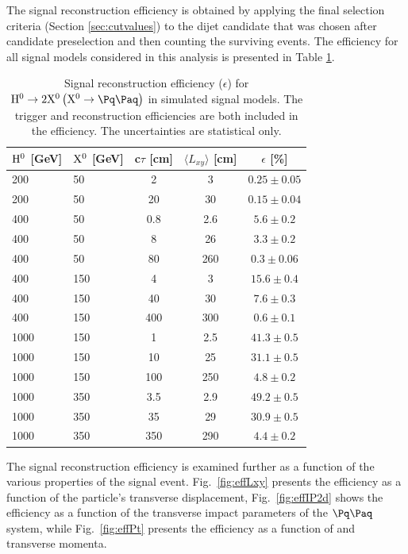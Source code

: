 The signal reconstruction efficiency is obtained by applying the final selection
criteria (Section \ref{sec:cutvalues}) to the dijet candidate that was chosen 
after candidate preselection and then counting the surviving events.
The efficiency for all signal models considered in this analysis
is presented in Table 
\ref{tab:sigeff}. 

\begin{table}[htbp]
\centering
\caption{
Signal reconstruction efficiency ($\epsilon$) for $\Higgs \to 2\X \left(\X \to \qq\right)$ 
in simulated signal models.
The trigger and reconstruction efficiencies are both included in the efficiency.
The uncertainties are statistical only.\label{tab:sigeff}}
\vspace{0.1cm}
\begin{tabular}{llccc}
\hline
$\mathrm{H}^{0}$ [GeV] & $\mathrm{X^{0}}$ [GeV] & c$\tau$ [cm] & $\langle L_{xy} \rangle$ [cm] & $\epsilon$ [\%] \\
\hline
200 & 50 & 2 & 3 & $0.25 \pm 0.05$ \\
200 & 50 & 20 & 30 & $0.15 \pm 0.04$ \\
\hline
400 & 50 & 0.8 & 2.6 & $5.6 \pm 0.2$ \\
400 & 50 & 8 & 26 &  $3.3 \pm 0.2$ \\
400 & 50 & 80 & 260 & $0.3 \pm 0.06$ \\
\hline
400 & 150 & 4 & 3 & $15.6 \pm 0.4$ \\
400 & 150 & 40 & 30 & $7.6 \pm 0.3$ \\
400 & 150 & 400 & 300 & $0.6 \pm 0.1$ \\
\hline
1000 & 150 & 1 & 2.5 & $41.3 \pm 0.5$ \\
1000 & 150 & 10 & 25 & $31.1 \pm 0.5$ \\
1000 & 150 & 100 & 250 & $4.8 \pm 0.2$ \\
\hline
1000 & 350 & 3.5 & 2.9 & $49.2 \pm 0.5$ \\
1000 & 350 & 35 & 29 & $30.9 \pm 0.5$ \\
1000 & 350 & 350 & 290 & $4.4 \pm 0.2$ \\
\hline

\end{tabular}
\end{table}

The signal reconstruction efficiency is examined further as a function of the various
properties of the signal event. 
Fig.~\ref{fig:effLxy} presents the efficiency as a function of the \X particle's
transverse displacement, Fig.~\ref{fig:effIP2d} shows the efficiency as a function of
the transverse impact parameters of the $\qq$ system, while Fig.~\ref{fig:effPt} presents
the efficiency as a function of \Higgs and \X transverse momenta.

